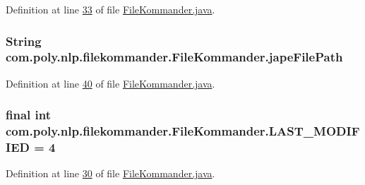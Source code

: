 Definition at line \hyperlink{L33}{33} of file \hyperlink{}{File\-Kommander.\-java}.

\hypertarget{classcom_1_1poly_1_1nlp_1_1filekommander_1_1_file_kommander_a2304e5f2732e0911893782dee866ee6d}{
\subsubsection[{jape\-File\-Path}]{\setlength{\rightskip}{0pt plus 5cm}String com.\-poly.\-nlp.\-filekommander.\-File\-Kommander.\-jape\-File\-Path\hspace{0.3cm}{\ttfamily [private]}}}\label{classcom_1_1poly_1_1nlp_1_1filekommander_1_1_file_kommander_a2304e5f2732e0911893782dee866ee6d}


Definition at line \hyperlink{L40}{40} of file \hyperlink{}{File\-Kommander.\-java}.

\hypertarget{classcom_1_1poly_1_1nlp_1_1filekommander_1_1_file_kommander_a0e06efa81ab1100008a3131c6d92ceca}{
\subsubsection[{L\-A\-S\-T\-\_\-\-M\-O\-D\-I\-F\-I\-E\-D}]{\setlength{\rightskip}{0pt plus 5cm}final int com.\-poly.\-nlp.\-filekommander.\-File\-Kommander.\-L\-A\-S\-T\-\_\-\-M\-O\-D\-I\-F\-I\-E\-D = 4\hspace{0.3cm}{\ttfamily [static]}}}\label{classcom_1_1poly_1_1nlp_1_1filekommander_1_1_file_kommander_a0e06efa81ab1100008a3131c6d92ceca}


Definition at line \hyperlink{L30}{30} of file \hyperlink{}{File\-Kommander.\-java}.

